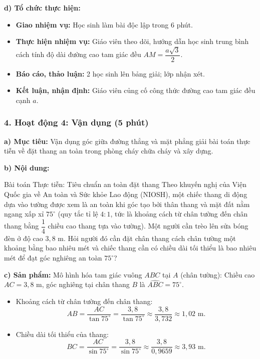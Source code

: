 \documentclass[12pt, a4paper]{article}
\begin{document}
\noindent \textbf{d) Tổ chức thực hiện:}
\begin{itemize}[leftmargin=0.6cm]
    \item \textbf{Giao nhiệm vụ:} Học sinh làm bài độc lập trong 6 phút.
    \item \textbf{Thực hiện nhiệm vụ:} Giáo viên theo dõi, hướng dẫn học sinh trung bình cách tính độ dài đường cao tam giác đều $AM = \dfrac{a\sqrt{3}}{2}$.
    \item \textbf{Báo cáo, thảo luận:} 2 học sinh lên bảng giải; lớp nhận xét.
    \item \textbf{Kết luận, nhận định:} Giáo viên củng cố công thức đường cao tam giác đều cạnh $a$.
\end{itemize}

\subsubsection*{4. Hoạt động 4: Vận dụng (5 phút)}

\noindent \textbf{a) Mục tiêu:}
Vận dụng góc giữa đường thẳng và mặt phẳng giải bài toán thực tiễn về đặt thang an toàn trong phòng cháy chữa cháy và xây dựng.

\noindent \textbf{b) Nội dung:}
\begin{pedabox}{Bài toán Thực tiễn: Tiêu chuẩn an toàn đặt thang}
Theo khuyến nghị của Viện Quốc gia về An toàn và Sức khỏe Lao động (NIOSH), một chiếc thang di động dựa vào tường được xem là an toàn khi góc tạo bởi thân thang và mặt đất nằm ngang xấp xỉ $75^\circ$ (quy tắc tỉ lệ $4:1$, tức là khoảng cách từ chân tường đến chân thang bằng $\dfrac{1}{4}$ chiều cao thang tựa vào tường).
Một người cần trèo lên sửa bóng đèn ở độ cao $3{,}8\text{ m}$. Hỏi người đó cần đặt chân thang cách chân tường một khoảng bằng bao nhiêu mét và chiếc thang cần có chiều dài tối thiểu là bao nhiêu mét để đạt góc nghiêng an toàn $75^\circ$?
\end{pedabox}

\noindent \textbf{c) Sản phẩm:}
Mô hình hóa tam giác vuông $ABC$ tại $A$ (chân tường):
Chiều cao $AC = 3{,}8\text{ m}$, góc nghiêng tại chân thang $B$ là $\widehat{ABC} = 75^\circ$.
\begin{itemize}
    \item Khoảng cách từ chân tường đến chân thang:
    $$AB = \dfrac{AC}{\tan 75^\circ} = \dfrac{3{,}8}{\tan 75^\circ} \approx \dfrac{3{,}8}{3{,}732} \approx 1{,}02\text{ m}.$$
    \item Chiều dài tối thiểu của thang:
    $$BC = \dfrac{AC}{\sin 75^\circ} = \dfrac{3{,}8}{\sin 75^\circ} \approx \dfrac{3{,}8}{0{,}9659} \approx 3{,}93\text{ m}.$$
\end{itemize}
\end{document}
